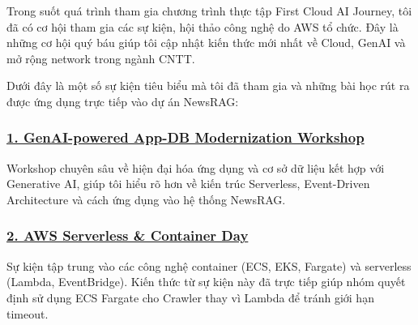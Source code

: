 Trong suốt quá trình tham gia chương trình thực tập First Cloud AI
Journey, tôi đã có cơ hội tham gia các sự kiện, hội thảo công nghệ do
AWS tổ chức. Đây là những cơ hội quý báu giúp tôi cập nhật kiến thức mới
nhất về Cloud, GenAI và mở rộng network trong ngành CNTT.

Dưới đây là một số sự kiện tiêu biểu mà tôi đã tham gia và những bài học
rút ra được ứng dụng trực tiếp vào dự án NewsRAG:

\hypertarget{genai-powered-app-db-modernization-workshop}{%
\subsubsection{\texorpdfstring{\href{4.1-Event1/}{1. GenAI-powered
App-DB Modernization
Workshop}}{1. GenAI-powered App-DB Modernization Workshop}}}

Workshop chuyên sâu về hiện đại hóa ứng dụng và cơ sở dữ liệu kết hợp
với Generative AI, giúp tôi hiểu rõ hơn về kiến trúc Serverless,
Event-Driven Architecture và cách ứng dụng vào hệ thống NewsRAG.

\hypertarget{aws-serverless-container-day}{%
\subsubsection{\texorpdfstring{\href{4.2-Event2/}{2. AWS Serverless \&
Container
Day}}{2. AWS Serverless \& Container Day}}}

Sự kiện tập trung vào các công nghệ container (ECS, EKS, Fargate) và
serverless (Lambda, EventBridge). Kiến thức từ sự kiện này đã trực tiếp
giúp nhóm quyết định sử dụng ECS Fargate cho Crawler thay vì Lambda để
tránh giới hạn timeout.
